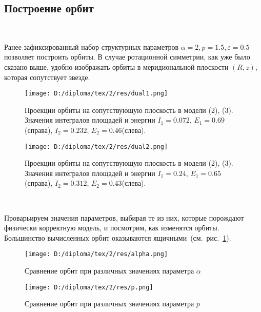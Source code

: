 \subsection{Построение орбит}
~\par
Ранее зафиксированный набор структурных параметров $\alpha = 2, p = 1.5, \varepsilon = 0.5$ позволяет построить орбиты. В случае ротационной симметрии, как уже было сказано выше, удобно изображать орбиты в меридиональной плоскости $(R,z)$, которая сопутствует звезде.\
{
\begin{figure}[H]
\centering
\begin{minipage}[t]{1\textwidth}
\centering
\texttt{[image: D:/diploma/tex/2/res/dual1.png]}
\end{minipage}
\caption{Проекции орбиты на сопутствующую плоскость в модели (2), (3). Значения интегралов площадей и энергии $I_1 = 0.072$, $E_1 = 0.69$ (справа), $I_2 = 0.232$, $E_2 = 0.46$(слева).}
\end{figure}

\begin{figure}[H]
\centering
\begin{minipage}[t]{1\textwidth}
\centering
\texttt{[image: D:/diploma/tex/2/res/dual2.png]}
\end{minipage}
\caption{Проекции орбиты на сопутствующую плоскость в модели (2), (3). Значения интегралов площадей и энергии $I_1 = 0.24$, $E_1 = 0.65$ (справа), $I_2 = 0.312$, $E_2 = 0.43$(слева).}
\end{figure}
}
~\par

Проварьируем значения параметров, выбирая те из них, которые порождают физически корректную модель, и посмотрим, как изменятся орбиты. Большинство вычисленных орбит оказываются ящичными~(см.~рис.~\ref{orbits:1}).

{
\begin{figure}[H]
\centering
\begin{minipage}[t]{0.8\textwidth}
\centering
\texttt{[image: D:/diploma/tex/2/res/alpha.png]}
\end{minipage}
\caption{Сравнение орбит при различных значениях параметра $\alpha$}\label{orbits:1}
\end{figure}
}

{
\begin{figure}[H]
\centering
\begin{minipage}[t]{0.8\textwidth}
\centering
\texttt{[image: D:/diploma/tex/2/res/p.png]}
\end{minipage}
\caption{Сравнение орбит при различных значениях параметра $p$}\label{orbits:2}
\end{figure}
}


